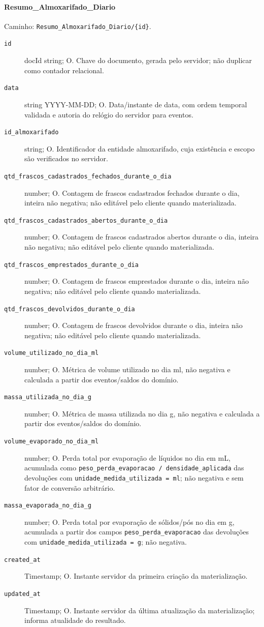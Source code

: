 \paragraph{Resumo\_Almoxarifado\_Diario}\mbox{}\par
Caminho: \texttt{Resumo\_Almoxarifado\_Diario/\{id\}}.
\begin{description}
\item[\texttt{id}] docId string; O. Chave do documento, gerada pelo servidor; não duplicar como contador relacional.
\item[\texttt{data}] string YYYY-MM-DD; O. Data/instante de data, com ordem temporal validada e autoria do relógio do servidor para eventos.
\item[\texttt{id\_almoxarifado}] string; O. Identificador da entidade almoxarifado, cuja existência e escopo são verificados no servidor.
\item[\texttt{qtd\_frascos\_cadastrados\_fechados\_durante\_o\_dia}] number; O. Contagem de frascos cadastrados fechados durante o dia, inteira não negativa; não editável pelo cliente quando materializada.
\item[\texttt{qtd\_frascos\_cadastrados\_abertos\_durante\_o\_dia}] number; O. Contagem de frascos cadastrados abertos durante o dia, inteira não negativa; não editável pelo cliente quando materializada.
\item[\texttt{qtd\_frascos\_emprestados\_durante\_o\_dia}] number; O. Contagem de frascos emprestados durante o dia, inteira não negativa; não editável pelo cliente quando materializada.
\item[\texttt{qtd\_frascos\_devolvidos\_durante\_o\_dia}] number; O. Contagem de frascos devolvidos durante o dia, inteira não negativa; não editável pelo cliente quando materializada.
\item[\texttt{volume\_utilizado\_no\_dia\_ml}] number; O. Métrica de volume utilizado no dia ml, não negativa e calculada a partir dos eventos/saldos do domínio.
\item[\texttt{massa\_utilizada\_no\_dia\_g}] number; O. Métrica de massa utilizada no dia g, não negativa e calculada a partir dos eventos/saldos do domínio.
\item[\texttt{volume\_evaporado\_no\_dia\_ml}] number; O. Perda total por evaporação de líquidos no dia em mL, acumulada como \texttt{peso\_perda\_evaporacao / densidade\_aplicada} das devoluções com \texttt{unidade\_medida\_utilizada = ml}; não negativa e sem fator de conversão arbitrário.
\item[\texttt{massa\_evaporada\_no\_dia\_g}] number; O. Perda total por evaporação de sólidos/pós no dia em g, acumulada a partir dos campos \texttt{peso\_perda\_evaporacao} das devoluções com \texttt{unidade\_medida\_utilizada = g}; não negativa.
\item[\texttt{created\_at}] Timestamp; O. Instante servidor da primeira criação da materialização.
\item[\texttt{updated\_at}] Timestamp; O. Instante servidor da última atualização da materialização; informa atualidade do resultado.
\end{description}

